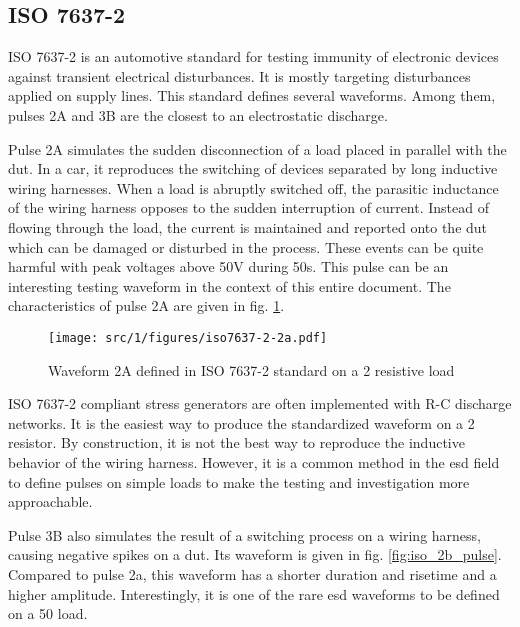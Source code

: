 \subsection{ISO 7637-2}

ISO 7637-2\cite{iso7637-2} is an automotive standard for testing immunity of electronic devices against transient electrical disturbances.
It is mostly targeting disturbances applied on supply lines.
This standard defines several waveforms.
Among them, pulses 2A and 3B are the closest to an electrostatic discharge.

Pulse 2A simulates the sudden disconnection of a load placed in parallel with the \gls{dut}.
In a car, it reproduces the switching of devices separated by long inductive wiring harnesses.
When a load is abruptly switched off, the parasitic inductance of the wiring harness opposes to the sudden interruption of current.
Instead of flowing through the load, the current is maintained and reported onto the \gls{dut} which can be damaged or disturbed in the process.
These events can be quite harmful with peak voltages above 50V during 50\textmu{}s.
This pulse can be an interesting testing waveform in the context of this entire document.
The characteristics of pulse 2A are given in fig. \ref{fig:iso_2a_pulse}.

\begin{figure}[!h]
  \centering
  \texttt{[image: src/1/figures/iso7637-2-2a.pdf]}
  \caption{Waveform 2A defined in ISO 7637-2 standard on a 2\textOmega{} resistive load}
  \label{fig:iso_2a_pulse}
\end{figure}

ISO 7637-2 compliant stress generators are often implemented with R-C discharge networks.
It is the easiest way to produce the standardized waveform on a 2\textOmega{} resistor.
By construction, it is not the best way to reproduce the inductive behavior of the wiring harness.
However, it is a common method in the \gls{esd} field to define pulses on simple loads to make the testing and investigation more approachable.

Pulse 3B also simulates the result of a switching process on a wiring harness, causing negative spikes on a \gls{dut}.
Its waveform is given in fig. \ref{fig:iso_2b_pulse}.
Compared to pulse 2a, this waveform has a shorter duration and risetime and a higher amplitude.
Interestingly, it is one of the rare \gls{esd} waveforms to be defined on a 50\textOmega{} load.

